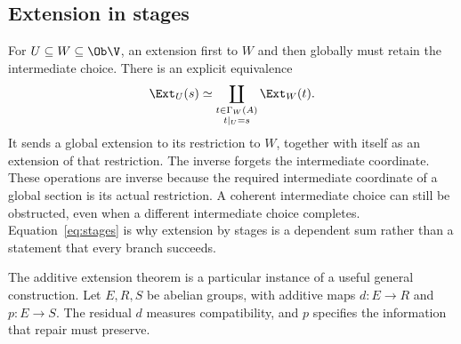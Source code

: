 \subsection{Extension in stages}
For \(U\subseteq W\subseteq\Ob\V\), an extension first to \(W\) and then globally must retain the intermediate choice. There is an explicit equivalence
\begin{equation}\label{eq:stages}
 \Ext_U(s)\simeq
 \coprod_{\substack{t\in\Gamma_W(A)\\t|_U=s}}\Ext_W(t).
\end{equation}
It sends a global extension to its restriction to \(W\), together with itself as an extension of that restriction. The inverse forgets the intermediate coordinate. These operations are inverse because the required intermediate coordinate of a global section is its actual restriction. A coherent intermediate choice can still be obstructed, even when a different intermediate choice completes. Equation~\eqref{eq:stages} is why extension by stages is a dependent sum rather than a statement that every branch succeeds.

\label{sec:protected}
The additive extension theorem is a particular instance of a useful general construction. Let \(E,R,S\) be abelian groups, with additive maps \(d:E\to R\) and \(p:E\to S\). The residual \(d\) measures compatibility, and \(p\) specifies the information that repair must preserve.

